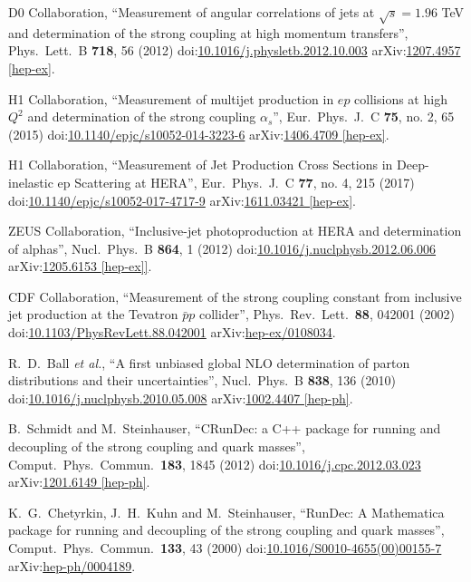 \begin{thebibliography}{99}
D0 Collaboration, ``Measurement of angular correlations of jets at $\sqrt{s}=1.96$ TeV and determination of the strong coupling at high momentum transfers'', Phys.\ Lett.\ B {\bf 718}, 56 (2012) doi:\href{http://dx.doi.org/10.1016/j.physletb.2012.10.003}{10.1016/j.physletb.2012.10.003} arXiv:\href{https://arxiv.org/abs/1207.4957}{1207.4957 [hep-ex]}.

H1 Collaboration, ``Measurement of multijet production in $ep$ collisions at high $Q^2$ and determination of the strong coupling $\alpha_s$'', Eur.\ Phys.\ J.\ C {\bf 75}, no. 2, 65 (2015) doi:\href{http://dx.doi.org/10.1140/epjc/s10052-014-3223-6}{10.1140/epjc/s10052-014-3223-6} arXiv:\href{https://arxiv.org/abs/1406.4709}{1406.4709 [hep-ex]}.

H1 Collaboration, ``Measurement of Jet Production Cross Sections in Deep-inelastic ep Scattering at HERA'', Eur.\ Phys.\ J.\ C {\bf 77}, no. 4, 215 (2017) doi:\href{http://dx.doi.org/10.1140/epjc/s10052-017-4717-9}{10.1140/epjc/s10052-017-4717-9} arXiv:\href{https://arxiv.org/abs/1611.03421}{1611.03421 [hep-ex]}.

ZEUS Collaboration, ``Inclusive-jet photoproduction at HERA and determination of alphas'', Nucl.\ Phys.\ B {\bf 864}, 1 (2012) doi:\href{http://dx.doi.org/10.1016/j.nuclphysb.2012.06.006}{10.1016/j.nuclphysb.2012.06.006} arXiv:\href{https://arxiv.org/abs/1205.6153}{1205.6153 [hep-ex]]}.

CDF Collaboration, ``Measurement of the strong coupling constant from inclusive jet production at the Tevatron $\bar{p}p$ collider'', Phys.\ Rev.\ Lett.\ {\bf 88}, 042001 (2002) doi:\href{http://dx.doi.org/10.1103/PhysRevLett.88.042001}{10.1103/PhysRevLett.88.042001} arXiv:\href{https://arxiv.org/pdf/hep-ex/0108034.pdf}{hep-ex/0108034}.

R.~D.~Ball {\it et al.}, ``A first unbiased global NLO determination of parton distributions and their uncertainties'', Nucl.\ Phys.\ B {\bf 838}, 136 (2010) doi:\href{http://dx.doi.org/10.1016/j.nuclphysb.2010.05.008}{10.1016/j.nuclphysb.2010.05.008} arXiv:\href{https://arxiv.org/abs/1002.4407}{1002.4407 [hep-ph]}.

B.~Schmidt and M.~Steinhauser, ``CRunDec: a C++ package for running and decoupling of the strong coupling and quark masses'', Comput.\ Phys.\ Commun.\ {\bf 183}, 1845 (2012) doi:\href{http://dx.doi.org/10.1016/j.cpc.2012.03.023}{10.1016/j.cpc.2012.03.023} arXiv:\href{https://arxiv.org/abs/1201.6149}{1201.6149 [hep-ph]}.

K.~G.~Chetyrkin, J.~H.~Kuhn and M.~Steinhauser, ``RunDec: A Mathematica package for running and decoupling of the strong coupling and quark masses'', Comput.\ Phys.\ Commun.\ {\bf 133}, 43 (2000) doi:\href{http://dx.doi.org/10.1016/S0010-4655(00)00155-7}{10.1016/S0010-4655(00)00155-7} arXiv:\href{https://arxiv.org/abs/hep-ph/0004189}{hep-ph/0004189}.


\end{thebibliography}
